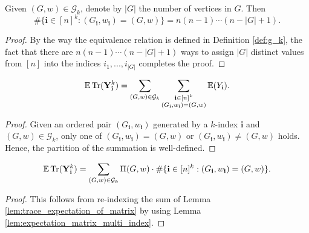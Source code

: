 \begin{lemma}
  \label{lem:lem_4.3}
  Given $(G,w) \in \mathcal{G}_k$, denote by $|G|$ the number of vertices in $G$. Then
  \[
  \# \{ \mathbf{i} \in [n]^k : (G_\mathbf{i},w_\mathbf{i}) = (G,w) \} = n (n-1) \cdots (n - |G| + 1).
  \]
\end{lemma}
\begin{proof}
  By the way the equivalence relation is defined in Definition \ref{def:g_k}, 
  the fact that there are $n (n - 1) \cdots (n -|G| + 1)$ ways to assign $|G|$ distinct values from $[n]$ into the indices $i_1,...,i_{|G|}$ completes the proof.
\end{proof}
\begin{lemma}
  \label{lem:equation_4.5_1}
  \[
  {\mathbb{E}} \operatorname{Tr} (\mathbf{Y}_\mathbf{i}^k) = \sum_{(G,w) \in \mathcal{G}_k} \sum_{\substack{\mathbf{i} \in [n]^k \\ (G_\mathbf{i},w_\mathbf{i}) = (G,w)}} {\mathbb{E}} (Y_\mathbf{i}).
  \]
\end{lemma}
\begin{proof}
  Given an ordered pair $(G_\mathbf{i},w_\mathbf{i})$ generated by a $k$-index $\mathbf{i}$ and $(G,w) \in \mathcal{G}_k$, 
  only one of $(G_\mathbf{i},w_\mathbf{i}) = (G,w)$ or $(G_\mathbf{i},w_\mathbf{i}) \neq (G,w)$ holds. 
  Hence, the partition of the summation is well-defined.
\end{proof}
\begin{lemma}
  \label{lem:equation_4.5_2}
  \[
  {\mathbb{E}} \operatorname{Tr} (\mathbf{Y}_\mathbf{i}^k) = \sum_{(G,w) \in \mathcal{G}_k} \Pi (G,w) \cdot \# \{ \mathbf{i} \in [n]^k : (G_\mathbf{i},w_\mathbf{i}) = (G,w) \}.
  \]
\end{lemma}
\begin{proof}
  This follows from re-indexing the sum of Lemma \ref{lem:trace_expectation_of_matrix} by using Lemma \ref{lem:expectation_matrix_multi_index}.
\end{proof}
